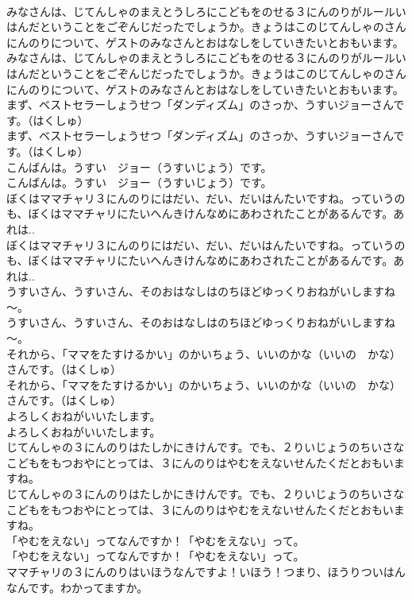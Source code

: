 \documentclass[8pt]{extreport}
\begin{document}
\begin{CJK}{UTF8}{min}
\\	みなさんは、じてんしゃのまえとうしろにこどもをのせる３にんのりがルールいはんだということをごぞんじだったでしょうか。きょうはこのじてんしゃのさんにんのりについて、ゲストのみなさんとおはなしをしていきたいとおもいます。
\\	みなさんは、じてんしゃのまえとうしろにこどもをのせる３にんのりがルールいはんだということをごぞんじだったでしょうか。きょうはこのじてんしゃのさんにんのりについて、ゲストのみなさんとおはなしをしていきたいとおもいます。
\\	まず、ベストセラーしょうせつ「ダンディズム」のさっか、うすいジョーさんです。（はくしゅ）
\\	まず、ベストセラーしょうせつ「ダンディズム」のさっか、うすいジョーさんです。（はくしゅ）
\\	こんばんは。うすい　ジョー（うすいじょう）です。
\\	こんばんは。うすい　ジョー（うすいじょう）です。
\\	ぼくはママチャリ３にんのりにはだい、だい、だいはんたいですね。っていうのも、ぼくはママチャリにたいへんきけんなめにあわされたことがあるんです。あれは..
\\	ぼくはママチャリ３にんのりにはだい、だい、だいはんたいですね。っていうのも、ぼくはママチャリにたいへんきけんなめにあわされたことがあるんです。あれは..
\\	うすいさん、うすいさん、そのおはなしはのちほどゆっくりおねがいしますね～。
\\	うすいさん、うすいさん、そのおはなしはのちほどゆっくりおねがいしますね～。
\\	それから、「ママをたすけるかい」のかいちょう、いいのかな（いいの　かな）さんです。（はくしゅ）
\\	それから、「ママをたすけるかい」のかいちょう、いいのかな（いいの　かな）さんです。（はくしゅ）
\\	よろしくおねがいいたします。
\\	よろしくおねがいいたします。
\\	じてんしゃの３にんのりはたしかにきけんです。でも、２りいじょうのちいさなこどもをもつおやにとっては、３にんのりはやむをえないせんたくだとおもいますね。
\\	じてんしゃの３にんのりはたしかにきけんです。でも、２りいじょうのちいさなこどもをもつおやにとっては、３にんのりはやむをえないせんたくだとおもいますね。
\\	「やむをえない」ってなんですか！「やむをえない」って。
\\	「やむをえない」ってなんですか！「やむをえない」って。
\\	ママチャリの３にんのりはいほうなんですよ！いほう！つまり、ほうりついはんなんです。わかってますか。

\end{CJK}
\end{document}
